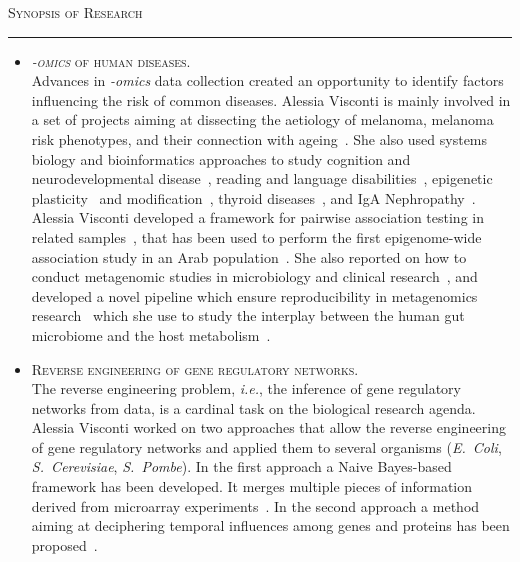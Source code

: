 \documentclass[a4paper,10pt]{article}
\newcommand{\mediumtitle}[1]{
	\vspace{0.2cm}
	{\noindent
	\Large \textsc{#1}\\[-2ex]
	\hrule
	\vspace{0.2cm}}
}
\newcommand{\smalltitle}[1]{
	\vspace{0.1cm}
	{\noindent 
	\large \textsc{#1}}
	\vspace{0.1cm}
}
\newcommand{\bulletitem}{\item[$\bullet$]}
\begin{document}
\newpage


\mediumtitle{Synopsis of Research}

\begin{itemize}
	
\bulletitem \smalltitle{\emph{-omics} of human diseases.}\\
Advances in \emph{-omics} data collection created an opportunity to identify factors influencing the risk of common diseases. Alessia Visconti is mainly involved in a set of projects aiming at dissecting the aetiology of melanoma, melanoma risk phenotypes, and their connection with ageing~\cite{Rib16,Pui16,Hys18,Vis18a,Duf17,Vis19a,Vis20,Lan20,San20,Swi15}. 
She also used systems biology and bioinformatics approaches to study cognition and neurodevelopmental disease~\cite{Joh15,Cul18}, reading and language disabilities~\cite{Gia16}, epigenetic plasticity~\cite{Car16} and modification~\cite{Zag18}, thyroid diseases~\cite{Mar20}, and IgA Nephropathy~\cite{Lom16}. 
Alessia Visconti developed a framework for pairwise association testing in related samples~\cite{Vis16}, that has been used to perform the first epigenome-wide association study in an Arab population~\cite{AlM15}. 
She also reported on how to conduct metagenomic studies in microbiology and clinical research~\cite{Vis18c}, and developed a novel pipeline which ensure reproducibility in metagenomics research~\cite{Vis18b} which she use to study the interplay between the human gut microbiome and the host metabolism~\cite{Vis19}.
	
\bulletitem \smalltitle{Reverse engineering of gene regulatory networks.}\\
The reverse engineering problem, \emph{i.e.}, the inference of gene regulatory networks from data, is a cardinal task on the biological research agenda.
Alessia Visconti worked on two approaches that allow the reverse engineering of gene regulatory networks and applied them to several organisms (\emph{E.~Coli}, \emph{S.~Cerevisiae}, \emph{S.~Pombe}). In the first approach a Naive Bayes-based framework has been developed. It merges multiple pieces of information derived from microarray experiments~\cite{Mar12, Vis11b}. In the second approach a method aiming at deciphering temporal influences among genes and proteins has been proposed~\cite{Vis12b}. 


\end{itemize}
\end{document}
